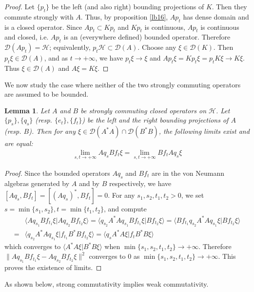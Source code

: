 \documentclass[11pt,b5paper,notitlepage]{article}
\theoremstyle{definition}
\theoremstyle{plain}
\newtheorem{lm}[df]{Lemma}
\newcommand{\mc}{\mathcal}
\newcommand{\Dom}{\scr D}
\newcommand{\bk}[1]{\langle {#1}\rangle}
\newcommand{\scr}{\mathscr}
\numberwithin{equation}{subsection}
\begin{document}
\begin{subappendices}
\begin{proof}
	Let $\{p_t\}$ be the left (and also right) bounding projections of $K$. Then they commute strongly with $A$. Thus, by proposition \ref{lb16}, $Ap_t$ has dense domain and is a closed operator. Since $Ap_t\subset Kp_t$ and $Kp_t$ is continuous, $Ap_t$ is  continuous and closed, i.e. $Ap_t$ is an (everywhere defined) bounded operator. Therefore $\Dom(Ap_t)=\mc H$; equivalently, $p_t\mc H\subset\Dom(A)$. Choose any $\xi\in\Dom(K)$. Then $p_t\xi\in\Dom(A)$, and as $t\rightarrow+\infty$, we have $p_t\xi\rightarrow\xi$ and  $Ap_t\xi=Kp_t\xi=p_tK\xi\rightarrow K\xi$. Thus $\xi\in\Dom(A)$ and $A\xi=K\xi$.
\end{proof}




We now study the case where neither of the two strongly commuting operators are assumed to be bounded.


\begin{lm}\label{lb4}
	Let $A$ and $B$ be strongly commuting closed operators on $\mc H$. Let $\{p_s\},\{q_s\}$ (resp. $\{e_t\},\{f_t\}$) be the left and the right bounding projections of $A$ (resp. $B$). Then for any $\xi\in\Dom(A^*A)\cap\Dom(B^*B)$, the following limits exist and are equal:
	\begin{align}
	\lim_{s,t\rightarrow+\infty}Aq_sBf_t\xi=\lim_{s,t\rightarrow+\infty}Bf_tAq_s\xi\label{eq3}
	\end{align}
\end{lm}


\begin{proof}
	Since the bounded operators $Aq_s$ and $Bf_t$ are in the von Neumann algebras generated by $A$ and by $B$ respectively, we have $[Aq_s,Bf_t]=[(Aq_s)^*,Bf_t]=0$. 	For any $s_1,s_2,t_1,t_2>0$, we set $s=\min\{s_1,s_2\},t=\min\{t_1,t_2\}$, and compute
	\begin{align*}
	&\bk{Aq_{s_1}Bf_{t_1}\xi|Aq_{s_2}Bf_{t_2}\xi}=\bk{q_{s_2}A^*Aq_{s_1}Bf_{t_1}\xi|Bf_{t_2}\xi}=\bk{Bf_{t_1}q_{s_2}A^*Aq_{s_1}\xi|Bf_{t_2}\xi}\\
	=&\bk{q_{s_2}A^*Aq_{s_1}\xi|f_{t_1}B^*Bf_{t_2}\xi}=\bk{q_sA^*A\xi|f_tB^*B\xi}
	\end{align*}
	which converges to $\bk{A^*A\xi|B^*B\xi}$ when $\min\{s_1,s_2,t_1,t_2\}\rightarrow+\infty$. Therefore $\lVert Aq_{s_1}Bf_{t_1}\xi- Aq_{s_2}Bf_{t_2}\xi\lVert^2$ converges to $0$ as $\min\{s_1,s_2,t_1,t_2\}\rightarrow+\infty$. This proves the existence of limits.
\end{proof}


As shown below, strong commutativity implies weak commutativity.


\end{subappendices}
\end{document}
